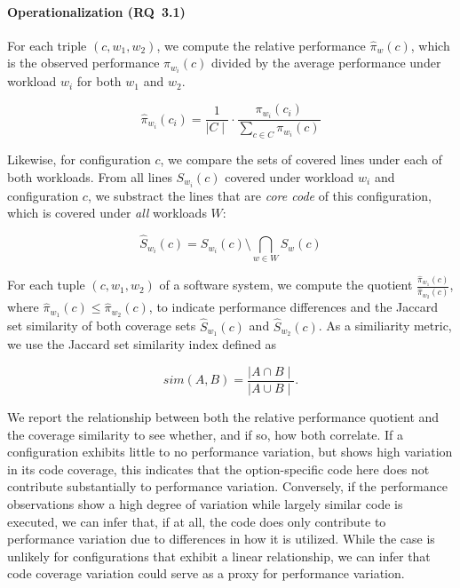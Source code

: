 

\paragraph*{Operationalization (RQ~3.1)} For each triple $(c, w_1, w_2)$, we compute the relative performance $\hat{\pi}_{w}(c)$, which is the observed performance $\pi_{w_i}(c)$ divided by the average performance under workload $w_i$ for both $w_1$ and $w_2$. 

\begin{equation}
	\hat{\pi}_{w_i}(c_i) =  \frac{1}{\mid C \mid} \cdot \frac{\pi_{w_i}(c_i)}{\sum_{c\in C} \pi_{w_i}(c)}
\end{equation}

Likewise, for configuration $c$, we compare the sets of covered lines under each of both workloads. From all lines $S_{w_i}(c)$ covered under workload $w_i$ and configuration $c$, we substract the lines that are \emph{core code} of this configuration, which is covered under \emph{all} workloads $W$:

\begin{equation}
\hat{S}_{w_i}(c)	 = S_{w_i}(c) \setminus \bigcap_{w\in W} S_{w}(c)
\end{equation}

For each tuple $(c, w_1, w_2)$ of a software system, we compute the quotient 
$\frac{\hat{\pi}_{w_1}(c) }{ \hat{\pi}_{w_2}(c) }$, where $\hat{\pi}_{w_1}(c) \leq \hat{\pi}_{w_2}(c)$, to indicate performance differences and the Jaccard set similarity of both coverage sets $\hat{S}_{w_1}(c)$ and $\hat{S}_{w_2}(c)$. As a similiarity metric, we use the Jaccard set similarity index defined as

\begin{equation}
	sim (A, B) = \frac{\mid A \cap B\mid}{\mid A\cup B \mid}.
\end{equation} 

We report the relationship between both the relative performance quotient and the coverage similarity to see whether, and if so, how both correlate. If a configuration exhibits little to no performance variation, but shows high variation in its code coverage, this indicates that the option-specific code here does not contribute substantially to performance variation. Conversely, if the performance observations show a high degree of variation while largely similar code is executed, we can infer that, if at all, the code does only contribute to performance variation due to differences in how it is utilized. While the case is unlikely for configurations that exhibit a linear relationship, we can infer that code coverage variation could serve as a proxy for performance variation. 

